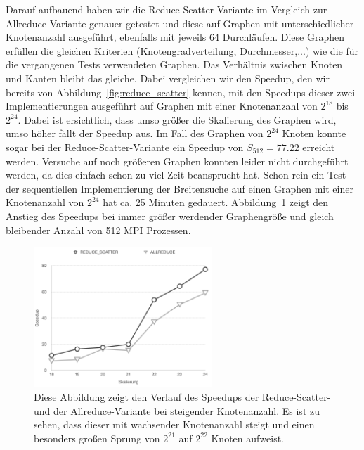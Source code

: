\documentclass[11pt,a4paper]{article}
\begin{document}
Darauf aufbauend haben wir die Reduce-Scatter-Variante im Vergleich zur Allreduce-Variante genauer getestet und diese auf Graphen mit unterschiedlicher Knotenanzahl ausgeführt, ebenfalls mit jeweils 64 Durchläufen. Diese Graphen erfüllen die gleichen Kriterien (Knotengradverteilung, Durchmesser,...) wie die für die vergangenen Tests verwendeten Graphen. Das Verhältnis zwischen Knoten und Kanten bleibt das gleiche. Dabei vergleichen wir den Speedup, den wir bereits von Abbildung~\ref{fig:reduce_scatter} kennen, mit den Speedups dieser zwei Implementierungen ausgeführt auf Graphen mit einer Knotenanzahl von \(2^{18}\) bis \(2^{24}\). Dabei ist ersichtlich, dass umso größer die Skalierung des Graphen wird, umso höher fällt der Speedup aus. Im Fall des Graphen von \(2^{24}\) Knoten konnte sogar bei der Reduce-Scatter-Variante ein Speedup von \(S_{512} = 77.22\) erreicht werden. Versuche auf noch größeren Graphen konnten leider nicht durchgeführt werden, da dies einfach schon zu viel Zeit beansprucht hat. Schon rein ein Test der sequentiellen Implementierung der Breitensuche auf einen Graphen mit einer Knotenanzahl von \(2^{24}\) hat ca. 25 Minuten gedauert. Abbildung~\ref{fig:speedups_reduce_scatter} zeigt den Anstieg des Speedups bei immer größer werdender Graphengröße und gleich bleibender Anzahl von 512 MPI Prozessen.
\begin{figure}[h]
 	\centering
	\includegraphics[width=0.6\textwidth]{speedups}
 	\caption{Diese Abbildung zeigt den Verlauf des Speedups der Reduce-Scatter- und der Allreduce-Variante bei steigender Knotenanzahl. Es ist zu sehen, dass dieser mit wachsender Knotenanzahl steigt und einen besonders großen Sprung von \(2^{21}\) auf \(2^{22}\) Knoten aufweist. }
	\label{fig:speedups_reduce_scatter}
\end{figure}
\end{document}
